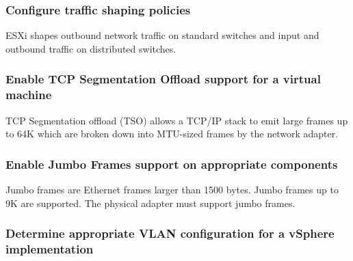 \subsubsection{Configure traffic shaping policies}

ESXi shapes outbound network traffic on standard switches and input and
outbound traffic on distributed switches.

\subsubsection{Enable TCP Segmentation Offload support for a virtual machine}

TCP Segmentation offload (TSO) allows a TCP/IP stack to emit large frames
up to 64K which are broken down into MTU-sized frames by the network adapter.

\subsubsection{Enable Jumbo Frames support on appropriate components}

Jumbo frames are Ethernet frames larger than 1500 bytes. Jumbo frames up to 9K
are supported. The physical adapter must support jumbo frames.

\subsubsection{Determine appropriate VLAN configuration for a vSphere implementation}
